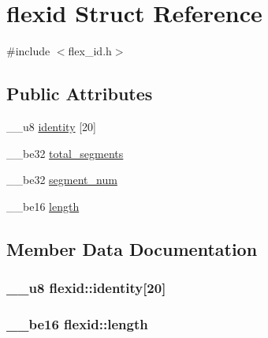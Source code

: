 \hypertarget{structflexid}{}\section{flexid Struct Reference}
\label{structflexid}


{\ttfamily \#include $<$flex\+\_\+id.\+h$>$}

\subsection*{Public Attributes}
\begin{DoxyCompactItemize}
\item 
\+\_\+\+\_\+u8 \hyperlink{structflexid_ab9e1df37109f8620f2be93955de9cb97}{identity} \mbox{[}20\mbox{]}
\item 
\+\_\+\+\_\+be32 \hyperlink{structflexid_a06122ad6fde6feb1e4edba60f476640e}{total\+\_\+segments}
\item 
\+\_\+\+\_\+be32 \hyperlink{structflexid_ae502fa12b4cd189628452ca8c6fd0dc0}{segment\+\_\+num}
\item 
\+\_\+\+\_\+be16 \hyperlink{structflexid_a652f4ff1a68f65a499f877337d4d7460}{length}
\end{DoxyCompactItemize}


\subsection{Member Data Documentation}
\subsubsection[{\texorpdfstring{identity}{identity}}]{\setlength{\rightskip}{0pt plus 5cm}\+\_\+\+\_\+u8 flexid\+::identity\mbox{[}20\mbox{]}}\hypertarget{structflexid_ab9e1df37109f8620f2be93955de9cb97}{}\label{structflexid_ab9e1df37109f8620f2be93955de9cb97}
\subsubsection[{\texorpdfstring{length}{length}}]{\setlength{\rightskip}{0pt plus 5cm}\+\_\+\+\_\+be16 flexid\+::length}\hypertarget{structflexid_a652f4ff1a68f65a499f877337d4d7460}{}\label{structflexid_a652f4ff1a68f65a499f877337d4d7460}
